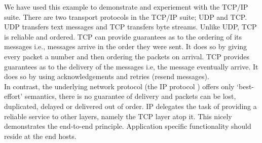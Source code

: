 We have used this example to demonstrate and experiement with the TCP/IP suite. There are two transport protocols in the TCP/IP suite; UDP and TCP. UDP transfers text messages and TCP transfers byte streams. Unlike UDP, TCP is reliable and ordered. TCP can provide guarantees as to the ordering of its messages i.e., messages arrive in the order they were sent. It does so by giving every packet a number and then ordering the packets on arrival. TCP provides guarantees as to the delivery of the messages i.e, the message eventually arrive. It does so by using acknowledgements and retries (resend messages).   \\

In contrast, the underlying network protocol (the IP protocol ) offers only ‘best-effort’ semantics, there is no guarantee of delivery and packets can be lost, duplicated, delayed or delivered out of order. IP delegates the task of providing a reliable service to other layers, namely the TCP layer atop it. This nicely demonstrates the end-to-end principle. Application specific functionality should reside at the end hosts.\\



